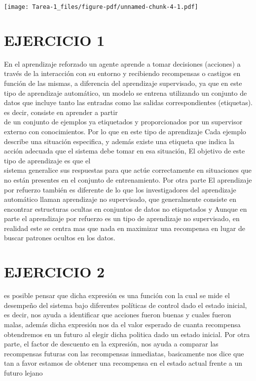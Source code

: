 \documentclass[
  letterpaper,
  DIV=11,
  numbers=noendperiod]{scrreprt}
\begin{document}
\texttt{[image: Tarea-1\_files/figure-pdf/unnamed-chunk-4-1.pdf]}

\section{EJERCICIO 1}\label{ejercicio-1}

En el aprendizaje reforzado un agente aprende a tomar decisiones
(acciones) a través de la interacción con su entorno y recibiendo
recompensas o castigos en función de las mismas, a diferencia del
aprendizaje supervisado, ya que en este tipo de aprendizaje automático,
un modelo se entrena utilizando un conjunto de datos que incluye tanto
las entradas como las salidas correspondientes (etiquetas). es decir,
consiste en aprender a partir\\
de un conjunto de ejemplos ya etiquetados y proporcionados por un
supervisor externo con conocimientos. Por lo que en este tipo de
aprendizaje Cada ejemplo describe una situación especifica, y además
existe una etiqueta que indica la acción adecuada que el sistema debe
tomar en esa situación, El objetivo de este tipo de aprendizaje es que
el\\
sistema generalice sus respuestas para que actúe correctamente en
situaciones que no están presentes en el conjunto de entrenamiento. Por
otra parte El aprendizaje por refuerzo también es diferente de lo que
los investigadores del aprendizaje automático llaman aprendizaje no
supervisado, que generalmente consiste en\\
encontrar estructuras ocultas en conjuntos de datos no etiquetados y
Aunque en parte el aprendizaje por refuerzo es un tipo de aprendizaje no
supervisado, en realidad este se centra mas que nada en maximizar una
recompensa en lugar de buscar patrones ocultos en los datos.

\section{EJERCICIO 2}\label{ejercicio-2}

es posible pensar que dicha expresión es una función con la cual se mide
el desempeño del sistema bajo diferentes políticas de control dado el
estado inicial, es decir, nos ayuda a identificar que acciones fueron
buenas y cuales fueron malas, además dicha expresión nos da el valor
esperado de cuanta recompensa obtendremos en un futuro al elegir dicha
politica dado un estado inicial. Por otra parte, el factor de descuento
en la expresión, nos ayuda a comparar las recompensas futuras con las
recompensas inmediatas, basicamente nos dice que tan a favor estamos de
obtener una recompensa en el estado actual frente a un futuro lejano
\end{document}
